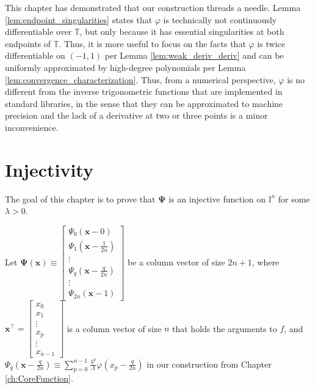 This chapter has demonstrated that our construction threads a needle. Lemma \ref{lem:endpoint_singularities} states that $\varphi$ is technically not continuously differentiable over $\mathbb{T}$, but only because it has essential singularities at both endpoints of $\mathbb{T}$. Thus, it is more useful to focus on the facts that $\varphi$ is twice differentiable on $\left(-1,1\right)$ per Lemma \ref{lem:weak_deriv_deriv} and can be uniformly approximated by high-degree polynomials per Lemma \ref{lem:convergence_characterization}. Thus, from a numerical perspective, $\varphi$ is no different from the inverse trigonometric functions that are implemented in standard libraries, in the sense that they can be approximated to machine precision and the lack of a derivative at two or three points is a minor inconvenience.

\chapter{Injectivity}\label{ch:Injectivity}

The goal of this chapter is to prove that $\boldsymbol{\Psi}$ is an injective function on $\mathbb{I}^n$ for some $\lambda > 0$.

\begin{definition}
  \label{def:Psi_vector}
  Let $\boldsymbol{\Psi}\left(\mathbf{x}\right) \equiv \begin{bmatrix}
      \Psi_0\left(\mathbf{x} - 0\right) \\
      \Psi_1\left(\mathbf{x} - \frac{1}{2n}\right) \\
      \vdots \\
      \Psi_q\left(\mathbf{x} - \frac{q}{2n}\right) \\
      \vdots \\
      \Psi_{2n}\left(\mathbf{x} - 1\right)
  \end{bmatrix}$ be a column vector of size $2n + 1$, where $\mathbf{x}^\top = \begin{bmatrix}
      x_0 \\ x_1 \\ \vdots \\ x_p \\ \vdots \\ x_{n - 1}
  \end{bmatrix}$ is a column vector of size $n$ that holds the arguments to $f$, and $\Psi_q\left(\mathbf{x} - \frac{q}{2n}\right) \equiv \sum\limits_{p = 0}^{n - 1} \frac{\lambda^p}{\Lambda} \varphi\left(x_p - \frac{q}{2n}\right)$ in our construction from Chapter \ref{ch:CoreFunction}.
\end{definition}

